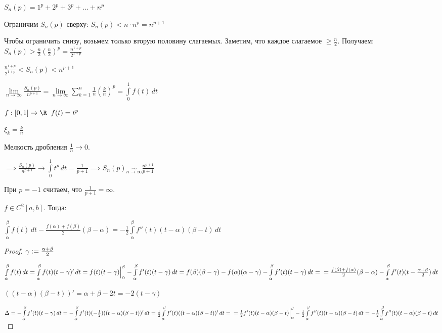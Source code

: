 

\begin{example}\slashns

	$S_n(p) = 1^p + 2^p + 3^p +...+n^p$
	
	Ограничим $S_n(p)$ сверху: $S_n(p) < n \cdot n^p = n^{p+1}$
	
	Чтобы ограничить снизу, возьмем только вторую половину слагаемых. Заметим, что каждое слагаемое $\geq\frac{n}{2}$. Получаем: $S_n(p) > \frac{n}{2} (\frac{n}{2})^p = \frac{n^{1+p}}{2^{1+p}}$
	
	$\frac{n^{1+p}}{2^{1+p}}  <S_n(p) < n^{p+1}$	
	
	$\lim\limits_{n \to \infty} \frac{S_n(p)}{n^{p+1}} = \lim\limits_{n \to \infty} \sum\limits_{k=1}^{n}\frac1n(\frac{k}{n})^p = \int\limits_0^1 f(t) \,dt$	
	
	$f: [0,1] \to \R \;\; f(t) = t^p$
	
	$\xi_k = \frac{k}{n}$
	
	Мелкость дробления $\frac1n \to 0$.
	
	$\implies\frac{S_n(p)}{n^{p+1}} \to \int\limits_0^1 t^p \,dt = \frac{1}{p+1}\implies S_n(p) \underset{n \to \infty}{\sim} \frac{n^{p + 1}}{p + 1}$	

	
	При $p=-1$ считаем, что $\frac1{p+1} = \infty$.
\end{example}

\begin{lemma}\slashns

    $f \in C^2[a,b]$. Тогда:

	$\int\limits_{\alpha}^{\beta} f(t) \, dt - \frac{f(\alpha) + f(\beta)}{2}(\beta - \alpha) = -\frac12 \int\limits_{\alpha}^{\beta} f''(t)(t-\alpha)(\beta - t) \, dt$	
\end{lemma}

\begin{proof}\slashns

	$\\ \gamma:= \frac{\alpha + \beta}{2}$
	
	$\int\limits_{\alpha}^{\beta} f(t) \, dt = \int\limits_{\alpha}^{\beta} f(t) (t - \gamma)'\, dt =  f(t)(t-\gamma) \Big|_{\alpha}^{\beta} - \int\limits_{\alpha}^{\beta} f'(t) (t - \gamma)\, dt
	= 
	f(\beta)(\beta-\gamma) - f(\alpha)(\alpha-\gamma) - \int\limits_{\alpha}^{\beta} f'(t) (t - \gamma)\, dt
	=\\=
	\frac{f(\beta) + f(\alpha)}{2}(\beta - \alpha)- \int\limits_{\alpha}^{\beta} f'(t) (t - \frac{\alpha+\beta}{2})\, dt$
	
	$((t-\alpha)(\beta - t))' = \alpha + \beta - 2t = -2(t - \gamma)$
	
	$\Delta = -\int\limits_{\alpha}^{\beta} f'(t)(t - \gamma)\, dt
	=
	-\int\limits_{\alpha}^{\beta} f'(t)(-\frac12)((t-\alpha)(\beta - t))'\, dt
	=\frac12\int\limits_{\alpha}^{\beta} f'(t)((t-\alpha)(\beta - t))'\, dt
	=\\=\frac12 f'(t)(t-\alpha)(\beta - t) \Big|_{\alpha}^{\beta} - \frac12 \int\limits_{\alpha}^{\beta} f''(t)(t-\alpha)(\beta - t) \, dt
	= -\frac12 \int\limits_{\alpha}^{\beta} f''(t)(t-\alpha)(\beta - t) \, dt$
\end{proof}

